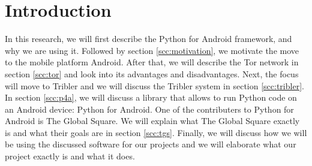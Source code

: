 \section{Introduction}
	
	
	In this research, we will first describe the Python for Android framework, and why we are using it. Followed by section \ref{scc:motivation}, we motivate the move to the mobile platform Android. After that, we will describe the Tor network in section \ref{scc:tor} and look into its advantages and disadvantages. Next, the focus will move to Tribler and we will discuss the Tribler system in section \ref{scc:tribler}. In section \ref{scc:p4a}, we will discuss a library that allows to run Python code on an Android device: Python for Android. One of the contributers to Python for Android is The Global Square. We will explain what The Global Square exactly is and what their goals are in section \ref{scc:tgs}. Finally, we will discuss how we will be using the discussed software for our projects and we will elaborate what our project exactly is and what it does.